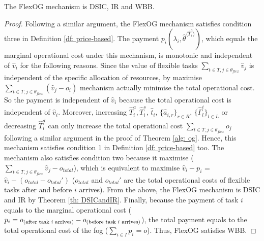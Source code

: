 \documentclass[11pt]{phdthesis}
\begin{document}
\begin{theorem}
    The FlexOG mechanism is DSIC, IR and WBB.
\end{theorem}

\begin{proof}
    Following a similar argument, the FlexOG mechanism satisfies condition three in Definition \ref{df: price-based}. The payment $p_i(\lambda_i, \hat{\theta}^{\langle \hat{T}_i^a \rangle})  $, which equals the marginal operational cost under this mechanism, is monotonic and independent of $ \hat{v}_i $ for the following reasons. Since the value of flexible tasks $ \underset{t\in T,  j \in \theta_{flex}}{\sum} \hat{v}_j  $ is independent of the specific allocation of resources, by maximise $ \underset{t\in T,  j \in \theta_{flex}}{\sum} (\hat{v}_j  - o_i )$ mechanism actually minimise the total operational cost. So the payment is independent of $ \hat{v}_i $ because the total operational cost is independent of $ \hat{v}_i $. Moreover, increasing $\hat{T}_i^a, \hat{T}_i^s$, $ \hat{t}_i $, $ \{ \hat{a}_{i,r} \}_{r \in R} $, $ \{ \hat{\Gamma}_l^i \}_{l \in L} $ or decreasing  $ \hat{T}_i^d$ can only increase the total operational cost $\underset{t\in T,  j \in \theta_{flex}}{\sum} o_j$ following a similar argument in the proof of Theorem \ref{alg: og}. Hence, this mechanism satisfies condition 1 in Definition \ref{df: price-based} too. The mechanism also satisfies condition two because it maximise ($ \underset{t\in T,  j \in \theta_{flex}}{\sum} \hat{v}_j  - o_{total}$), which is equivalent to maximise $ \hat{v}_i - p_i$ = $ \hat{v}_i - (o_{total} - o_{total}') $ ($ o_{total} $ and $ o_{total}' $ are the total operational costs of flexible tasks after and before $ i $ arrives). From the above, the FlexOG mechanism is DSIC and IR by Theorem \ref{th: DSICandIR}. Finally, because the payment of task $ i $ equals to the marginal operational cost ($ p_i = o_\text{(after task $ i $ arrives)} -o_\text{(before task $ i $ arrives)} $), the total payment equals to the total operational cost of the fog ($ \sum_{i \in I}{p_i} = o $). Thus, FlexOG satisfies WBB.

\end{proof}
\end{document}
